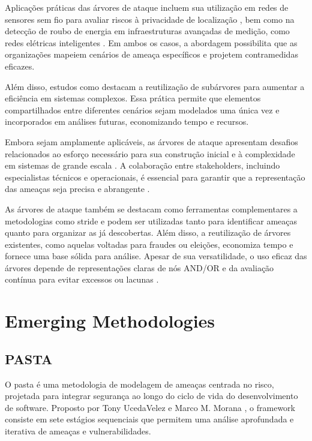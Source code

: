 Aplicações práticas das árvores de ataque incluem sua utilização em
redes de sensores sem fio para avaliar riscos à privacidade de
localização \cite{AnAttackTreeBasedRisk}, bem como na detecção de
roubo de energia em infraestruturas avançadas de medição, como redes
elétricas inteligentes \cite{Energytheftdetectionissues}. Em ambos os
casos, a abordagem possibilita que as organizações mapeiem cenários de
ameaça específicos e projetem contramedidas eficazes.

Além disso, estudos como \cite{FoundationsofAttackTrees} destacam a
reutilização de subárvores para aumentar a eficiência em sistemas
complexos. Essa prática permite que elementos compartilhados entre
diferentes cenários sejam modelados uma única vez e incorporados em
análises futuras, economizando tempo e recursos.

Embora sejam amplamente aplicáveis, as árvores de ataque apresentam
desafios relacionados ao esforço necessário para sua construção
inicial e à complexidade em sistemas de grande escala
\cite{AttackTrees}. A colaboração entre stakeholders, incluindo
especialistas técnicos e operacionais, é essencial para garantir que a
representação das ameaças seja precisa e abrangente
\cite{Energytheftdetectionissues}.

As árvores de ataque também se destacam como ferramentas
complementares a metodologias como \gls{stride} e podem ser utilizadas tanto
para identificar ameaças quanto para organizar as já descobertas. Além
disso, a reutilização de árvores existentes, como aquelas voltadas
para fraudes ou eleições, economiza tempo e fornece uma base sólida
para análise. Apesar de sua versatilidade, o uso eficaz das árvores
depende de representações claras de nós AND/OR e da avaliação contínua
para evitar excessos ou lacunas \cite{ThreatModelingdesigningForSecurity}.

\section{Emerging Methodologies}
\label{sec:emerging_methodologies}

\subsection{PASTA}
\label{subsec:pasta}

O \gls{pasta} é uma
metodologia de modelagem de ameaças centrada no risco, projetada para
integrar segurança ao longo do ciclo de vida do desenvolvimento de
software. Proposto por Tony UcedaVelez e Marco M. Morana
\cite{RiskCentricThreatModeling}, o framework consiste em sete
estágios sequenciais que permitem uma análise aprofundada e iterativa
de ameaças e vulnerabilidades.

